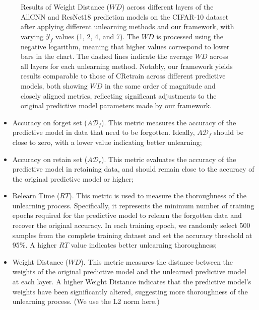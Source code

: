 \documentclass[preprint,12pt]{elsarticle}
\begin{document}
\begin{figure}[!h]
\caption{Results of Weight Distance ($\textit{WD}$) across different layers of the AllCNN and ResNet18 prediction models on the CIFAR-10 dataset after applying different unlearning methods and our framework, with varying $\mathcal{Y}_f$ values (1, 2, 4, and 7). The $\textit{WD}$ is processed using the negative logarithm, meaning that higher values correspond to lower bars in the chart. The dashed lines indicate the average $\textit{WD}$ across all layers for each unlearning method. Notably, our framework yields results comparable to those of CRetrain across different predictive models, both showing $\textit{WD}$ in the same order of magnitude and closely aligned metrics, reflecting significant adjustments to the original predictive model parameters made by our framework.}


\label{fig_figure3}
\end{figure}


\begin{itemize}
    \item   Accuracy on forget set ($A\mathcal{D}_f$). This metric measures the accuracy of the predictive model in data that need to be forgotten. Ideally, $A\mathcal{D}_f$ should be close to zero, with a lower value indicating better unlearning;
    \item   Accuracy on retain set ($A\mathcal{D}_r$). This metric evaluates the accuracy of the predictive model in retaining data, and should remain close to the accuracy of the original predictive model or higher; 
    \item  Relearn Time (\(RT\)). This metric is used to measure the thoroughness of the unlearning process. Specifically, it represents the minimum number of training epochs required for the predictive model to relearn the forgotten data and recover the original accuracy. In each training epoch, we randomly select 500 samples from the complete training dataset and set the accuracy threshold at 95\%. A higher \(RT\) value indicates better unlearning thoroughness; 
    \item  Weight Distance ($\textit{WD}$). This metric measures the distance between the weights of the original predictive model and the unlearned predictive model at each layer. A higher Weight Distance indicates that the predictive model's weights have been significantly altered, suggesting more thoroughness of the unlearning process. (We use the L2 norm here.)
\end{itemize}
\end{document}
